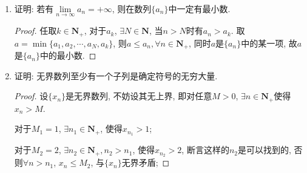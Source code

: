 \documentclass[a4paper,11pt,twoside]{ctexbook}
\begin{document}
\begin{enumerate}
\begin{proof}
		      举一个无最小数的例子: $x_n=1+1/n, n\in\mathbf{N}_{+}$.\qedhere
	      \end{proof}
	\item 证明: 若有$\lim\limits_{n\to\infty} a_n=+\infty$, 则在数列$\{a_n\}$中一定有最小数.
	      \begin{proof}
		      任取$k\in\mathbf{N}_{+}$, 对于$a_k$, $\exists N\in\mathbf{N}$, 当$n>N$时有$a_n>a_k$. 取$a=\min\{a_1,a_2,\cdots,a_N,a_k\}$, 则$a\leqslant a_n, \forall n\in\mathbf{N}_{+}$, 同时$a$是$\{a_n\}$中的某一项, 故$a$是$\{a_n\}$中的最小数.\qedhere
	      \end{proof}
	\item 证明: 无界数列至少有一个子列是确定符号的无穷大量.
	      \begin{proof}
		      设$\{x_n\}$是无界数列, 不妨设其无上界, 即对任意$M>0$, $\exists n\in\mathbf{N}_{+}$使得$x_n>M$.

		      对于$M_1=1$, $\exists n_1\in\mathbf{N}_{+}$, 使得$x_{n_1}>1$;

		      对于$M_2=2$, $\exists n_2\in\mathbf{N}_{+}, n_2>n_1$, 使得$x_{n_2}>2$, 断言这样的$n_2$是可以找到的, 否则$\forall n>n_1$, $x_n\leqslant M_2$, 与$\{x_n\}$无界矛盾;


\end{proof}
\end{enumerate}
\end{document}
